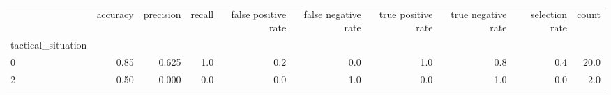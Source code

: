 \begin{tabular}{lrrrrrrrrr}
\toprule
{} &  accuracy &  precision &  recall &  false positive rate &  false negative rate &  true positive rate &  true negative rate &  selection rate &  count \\
tactical\_situation &           &            &         &                      &                      &                     &                     &                 &        \\
\midrule
0                  &      0.85 &      0.625 &     1.0 &                  0.2 &                  0.0 &                 1.0 &                 0.8 &             0.4 &   20.0 \\
2                  &      0.50 &      0.000 &     0.0 &                  0.0 &                  1.0 &                 0.0 &                 1.0 &             0.0 &    2.0 \\
\bottomrule
\end{tabular}
